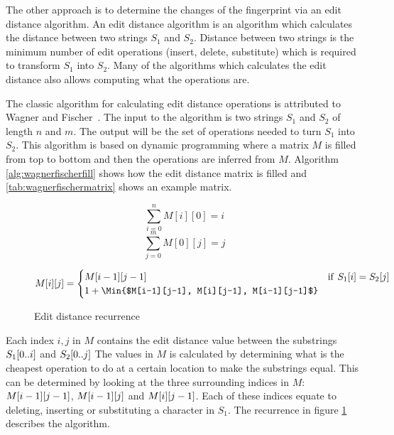 The other approach is to determine the changes of the fingerprint via an edit distance
algorithm. An edit distance algorithm is an algorithm which calculates the distance
between two strings $S_1$ and $S_2$. Distance between two strings is the minimum number of
edit operations (insert, delete, substitute) which is required to transform $S_1$ into
$S_2$. Many of the algorithms which calculates the edit distance also allows computing
what the operations are.

The classic algorithm for calculating edit distance operations is attributed to Wagner and
Fischer~\cite{WagnerFischer}. The input to the algorithm is two strings $S_1$ and $S_2$ of
length $n$ and $m$. The output will be the set of operations needed to turn $S_1$ into
$S_2$. This algorithm is based on dynamic programming where a matrix $M$ is filled from
top to bottom and then the operations are inferred from $M$. Algorithm
\ref{alg:wagnerfischerfill} shows how the edit distance matrix is filled and
\ref{tab:wagnerfischermatrix} shows an example matrix.

\begin{figure}[t]
    \begin{center}
	$$
		\sum^{n}_{i = 0}{M[i][0] = i}
	$$
	$$
		\sum^{m}_{j = 0}{M[0][j] = j}
	$$

	\begin{gather*}
		M[i][j] =
		\begin{cases}
			M[i-1][j-1] & \mathrm{if\ } S_1[i] = S_2[j] \\
            1 + \Min{$M[i-1][j-1], M[i][j-1], M[i-1][j-1]$}
		\end{cases}
	\end{gather*}
	\caption{Edit distance recurrence}
	\label{eq:editdistancerecurrence}
    \end{center}
\end{figure}

Each index $i, j$ in $M$ contains the edit distance value between the substrings
$S_1[{0..i}]$ and $S_2[{0..j}]$ The values in $M$ is calculated by
determining what is the cheapest operation to do at a certain location to make the
substrings equal. This can be determined by looking at the three surrounding indices in
$M$: $M[{i - 1}][{j - 1}]$, $M[{i - 1}][{j}]$ and
$M[{i}][{j - 1}]$. Each of these indices equate to deleting, inserting or
substituting a character in $S_1$. The recurrence in figure
\ref{eq:editdistancerecurrence} describes the algorithm.


